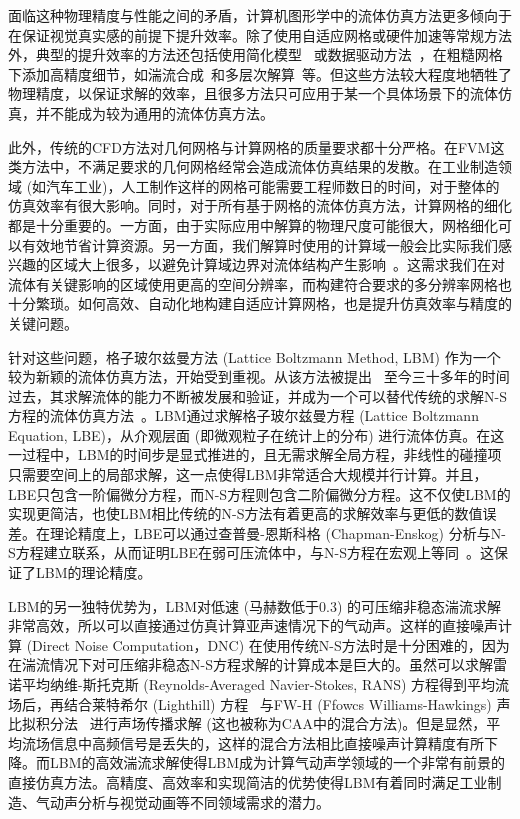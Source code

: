 面临这种物理精度与性能之间的矛盾，计算机图形学中的流体仿真方法更多倾向于在保证视觉真实感的前提下提升效率。除了使用自适应网格或硬件加速等常规方法外，典型的提升效率的方法还包括使用简化模型~\citep{doi.org/10.1111/cgf.12825} 或数据驱动方法~\citep{10.1145/2816795.2818129}，在粗糙网格下添加高精度细节，如湍流合成~\citep{10.1145/1360612.1360649}和多层次解算~\citep{10.1145/1833349.1778785}等。但这些方法较大程度地牺牲了物理精度，以保证求解的效率，且很多方法只可应用于某一个具体场景下的流体仿真，并不能成为较为通用的流体仿真方法。

此外，传统的CFD方法对几何网格与计算网格的质量要求都十分严格。在FVM这类方法中，不满足要求的几何网格经常会造成流体仿真结果的发散。在工业制造领域 (如汽车工业)，人工制作这样的网格可能需要工程师数日的时间，对于整体的仿真效率有很大影响。同时，对于所有基于网格的流体仿真方法，计算网格的细化都是十分重要的。一方面，由于实际应用中解算的物理尺度可能很大，网格细化可以有效地节省计算资源。另一方面，我们解算时使用的计算域一般会比实际我们感兴趣的区域大上很多，以避免计算域边界对流体结构产生影响~\citep{coreixas2015round, doi:10.2514/6.2015-2993}。这需求我们在对流体有关键影响的区域使用更高的空间分辨率，而构建符合要求的多分辨率网格也十分繁琐。如何高效、自动化地构建自适应计算网格，也是提升仿真效率与精度的关键问题。

针对这些问题，格子玻尔兹曼方法 (Lattice Boltzmann Method, LBM) 作为一个较为新颖的流体仿真方法，开始受到重视。从该方法被提出~\citep{PhysRevLett.61.2332} 至今三十多年的时间过去，其求解流体的能力不断被发展和验证，并成为一个可以替代传统的求解N-S方程的流体仿真方法~\citep{ARUMUGAPERUMAL2015955}。LBM通过求解格子玻尔兹曼方程 (Lattice Boltzmann Equation, LBE)，从介观层面 (即微观粒子在统计上的分布) 进行流体仿真。在这一过程中，LBM的时间步是显式推进的，且无需求解全局方程，非线性的碰撞项只需要空间上的局部求解，这一点使得LBM非常适合大规模并行计算。并且，LBE只包含一阶偏微分方程，而N-S方程则包含二阶偏微分方程。这不仅使LBM的实现更简洁，也使LBM相比传统的N-S方法有着更高的求解效率与更低的数值误差。在理论精度上，LBE可以通过查普曼-恩斯科格 (Chapman-Enskog) 分析与N-S方程建立联系，从而证明LBE在弱可压流体中，与N-S方程在宏观上等同~\citep{Y.H.Qian_1993}。这保证了LBM的理论精度。

LBM的另一独特优势为，LBM对低速 (马赫数低于0.3) 的可压缩非稳态湍流求解非常高效，所以可以直接通过仿真计算亚声速情况下的气动声。这样的直接噪声计算 (Direct Noise Computation，DNC) 在使用传统N-S方法时是十分困难的，因为在湍流情况下对可压缩非稳态N-S方程求解的计算成本是巨大的。虽然可以求解雷诺平均纳维-斯托克斯 (Reynolds-Averaged Navier-Stokes, RANS) 方程得到平均流场后，再结合莱特希尔 (Lighthill) 方程~\citep{doi:10.1098/rspa.1952.0060} 与FW-H (Ffowcs Williams-Hawkings) 声比拟积分法~\citep{doi:10.1098/rsta.1969.0031} 进行声场传播求解 (这也被称为CAA中的混合方法)。但是显然，平均流场信息中高频信号是丢失的，这样的混合方法相比直接噪声计算精度有所下降。而LBM的高效湍流求解使得LBM成为计算气动声学领域的一个非常有前景的直接仿真方法。高精度、高效率和实现简洁的优势使得LBM有着同时满足工业制造、气动声分析与视觉动画等不同领域需求的潜力。

